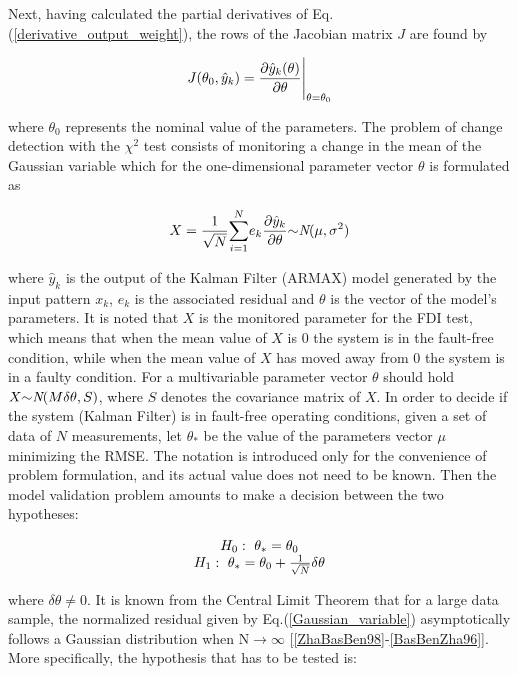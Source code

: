 \documentclass[journal]{IEEEtran}
\begin{document}
\noindent Next, having calculated the partial derivatives of Eq.(\ref{derivative_output_weight}), the rows of the Jacobian matrix $J$ are found by

\begin{equation} \label{Jacobian}
{J(\theta_0,\hat{y}_k)}={\partial {\hat{y}_k(\theta)} \over {\partial{\theta}} } {\Bigg\vert}_{\theta={\theta_0}}
\end{equation}

\noindent where $\theta_0$ represents the nominal value of the parameters. The problem of change detection with the $\chi^2$ test consists of monitoring a change in the mean of the Gaussian variable which for the one-dimensional parameter vector $\theta$ is formulated as

\begin{equation} \label{Gaussian_variable}
X={1 \over {\sqrt{N}}}{\sum_{i=1}^N}{e_k}{{{\partial}{\hat{y}_k}} \over {{\partial}{\theta}}}{\sim}\emph{N}(\mu,\sigma^2)
\end{equation}

\noindent where $\hat{y}_k$ is the output of the Kalman Filter (ARMAX) model generated by the input pattern $x_k$, $e_k$ is the associated residual and $\theta$ is the vector of the model's parameters. It is noted that $X$ is the monitored parameter for the FDI test, which means that when the mean value of $X$ is $0$ the system is in the fault-free condition, while when the mean value of $X$ has moved away from $0$ the system is in a faulty condition. For a  multivariable parameter vector $\theta$ should hold $X{\sim}{\emph{N}}(M{{\delta}\theta}, S)$, where $S$ denotes the covariance matrix of $X$. In order to decide if the system (Kalman Filter) is in fault-free operating conditions, given a set of data of $N$ measurements, let $\theta_{*}$ be the value of the parameters vector $\mu$ minimizing the RMSE. The notation is introduced only for the convenience of problem formulation, and its actual value does not need to be known. Then the model validation problem amounts to make a decision between the two hypotheses:

\begin{equation}\label{hypothesis_test}
\begin{tabular}{c}
$H_0: \ \theta_*=\theta_0$ \\
$H_1: \ \theta_*=\theta_0+{1 \over \sqrt{N}}{\delta}\theta$
\end{tabular}
\end{equation}

\noindent where ${\delta}{\theta}{\neq}0$. It is known from the Central Limit Theorem that for a large data sample, the normalized residual given by Eq.(\ref{Gaussian_variable}) asymptotically follows a Gaussian distribution when $\text{N}{\rightarrow}\infty$ [\ref{ZhaBasBen98}-\ref{BasBenZha96}]. More specifically, the hypothesis that has to be tested is:
\end{document}
